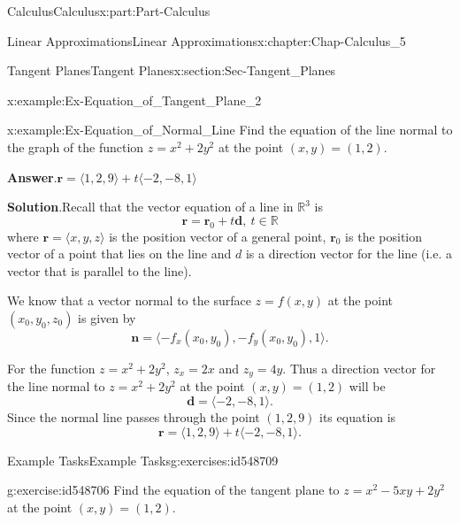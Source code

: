\documentclass[oneside,10pt,]{book}
\newcommand{\blocktitlefont}{\relax}
\numberwithin{equation}{section}
\newcommand{\bm}[1]{\boldsymbol{#1}}
\begin{document}
\begin{partptx}{Calculus}{}{Calculus}{}{}{x:part:Part-Calculus}
\begin{chapterptx}{Linear Approximations}{}{Linear Approximations}{}{}{x:chapter:Chap-Calculus_5}
\begin{sectionptx}{Tangent Planes}{}{Tangent Planes}{}{}{x:section:Sec-Tangent_Planes}
\begin{example}{}{x:example:Ex-Equation_of_Tangent_Plane_2}
\end{example}
\begin{example}{}{x:example:Ex-Equation_of_Normal_Line}%
Find the equation of the line normal to the graph of the function \(z=x^2+2y^2\) at the point \((x,y) = (1,2)\).%
\par\smallskip%
\noindent\textbf{\blocktitlefont Answer}.\hypertarget{g:answer:id548623}{}\quad{}\(\bm{r} = \langle 1, 2, 9 \rangle + t \langle -2, -8, 1 \rangle\)%
\par\smallskip%
\noindent\textbf{\blocktitlefont Solution}.\hypertarget{g:solution:id548625}{}\quad{}Recall that the vector equation of a line in \(\mathbb{R}^3\) is%
\begin{equation*}
\bm{r} = \bm{r}_0 + t \bm{d}, \: t \in \mathbb{R}
\end{equation*}
where \(\bm{r} = \langle x, y, z \rangle\) is the position vector of a general point, \(\bm{r}_0\) is the position vector of a point that lies on the line and \(d\) is a direction vector for the line (i.e. a vector that is parallel to the line).%
\par
We know that a vector normal to the surface \(z=f(x,y)\) at the point \((x_0,y_0,z_0)\) is given by%
\begin{equation*}
\bm{n} = \langle -f_x(x_0,y_0), -f_y(x_0,y_0),1 \rangle\text{.}
\end{equation*}
%
\par
For the function \(z=x^2+2y^2\), \(z_x=2x\) and \(z_y=4y\). Thus a direction vector for the line normal to \(z=x^2+2y^2\) at the point \((x,y)=(1,2)\) will be%
\begin{equation*}
\bm{d} = \langle -2, -8, 1 \rangle\text{.}
\end{equation*}
Since the normal line passes through the point \((1,2,9)\) its equation is%
\begin{equation*}
\bm{r} = \langle 1, 2, 9 \rangle + t \langle -2, -8, 1 \rangle\text{.}
\end{equation*}
%
\end{example}
%
%
\typeout{************************************************}
\typeout{************************************************}
%
\begin{exercises-subsection-numberless}{Example Tasks}{}{Example Tasks}{}{}{g:exercises:id548709}
\begin{divisionexercise}{1}{}{}{g:exercise:id548706}%
Find the equation of the tangent plane to \(z=x^2-5xy+2y^2\) at the point \((x,y)=(1,2)\).%
\end{divisionexercise}%

\end{exercises-subsection-numberless}
\end{sectionptx}
\end{chapterptx}
\end{partptx}
\end{document}
